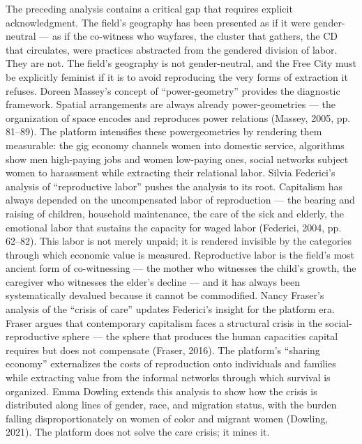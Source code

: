 The preceding analysis contains a critical gap that requires explicit acknowledgment. The field’s geography has been presented as if it were gender-neutral — as if the co-witness who wayfares, the cluster that gathers, the CD that circulates, were practices abstracted from the gendered division of labor. They are not. The field’s geography is not gender-neutral, and the Free City must be explicitly feminist if it is to avoid reproducing the very forms of extraction it refuses. Doreen Massey’s concept of “power-geometry” provides the diagnostic framework. Spatial arrangements are always already power-geometries — the organization of space encodes and reproduces power relations (Massey, 2005, pp. 81–89). The platform intensifies these powergeometries by rendering them measurable: the gig economy channels women into domestic service, algorithms show men high-paying jobs and women low-paying ones, social networks subject women to harassment while extracting their relational labor. Silvia Federici’s analysis of “reproductive labor” pushes the analysis to its root. Capitalism has always depended on the uncompensated labor of reproduction — the bearing and raising of children, household maintenance, the care of the sick and elderly, the emotional labor that sustains the capacity for waged labor (Federici, 2004, pp. 62–82). This labor is not merely unpaid; it is rendered invisible by the categories through which economic value is measured. Reproductive labor is the field’s most ancient form of co-witnessing — the mother who witnesses the child’s growth, the caregiver who witnesses the elder’s decline — and it has always been systematically devalued because it cannot be commodified. Nancy Fraser’s analysis of the “crisis of care” updates Federici’s insight for the platform era. Fraser argues that contemporary capitalism faces a structural crisis in the social-reproductive sphere — the sphere that produces the human capacities capital requires but does not compensate (Fraser, 2016). The platform’s “sharing economy” externalizes the costs of reproduction onto individuals and families while extracting value from the informal networks through which survival is organized. Emma Dowling extends this analysis to show how the crisis is distributed along lines of gender, race, and migration status, with the burden falling disproportionately on women of color and migrant women (Dowling, 2021). The platform does not solve the care crisis; it mines it.

